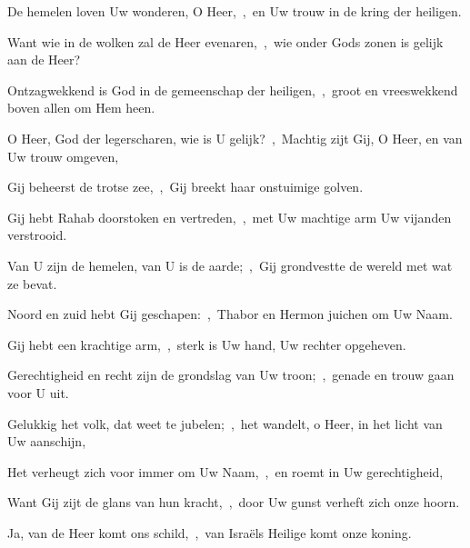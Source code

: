 \documentclass[12pt,twoside,a5paper]{article}
\begin{document}
\begin{halfparskip}
  De hemelen loven Uw wonderen, O Heer,~\sep\ en Uw trouw in de kring der heiligen.

  Want wie in de wolken zal de Heer evenaren,~\sep\ wie onder Gods zonen is gelijk aan de Heer?

  Ontzagwekkend is God in de gemeenschap der heiligen,~\sep\ groot en vreeswekkend boven allen om Hem heen.

  O Heer, God der legerscharen, wie is U gelijk?~\sep\ Machtig zijt Gij, O Heer, en van Uw trouw omgeven,

  Gij beheerst de trotse zee,~\sep\ Gij breekt haar onstuimige golven.

  Gij hebt Rahab doorstoken en vertreden,~\sep\ met Uw machtige arm Uw vijanden verstrooid.

  Van U zijn de hemelen, van U is de aarde;~\sep\ Gij grondvestte de wereld met wat ze bevat.

  Noord en zuid hebt Gij geschapen:~\sep\ Thabor en Hermon juichen om Uw Naam.

  Gij hebt een krachtige arm,~\sep\ sterk is Uw hand, Uw rechter opgeheven.

  Gerechtigheid en recht zijn de grondslag van Uw troon;~\sep\ genade en trouw gaan voor U uit.

  Gelukkig het volk, dat weet te jubelen;~\sep\ het wandelt, o Heer, in het licht van Uw aanschijn,

  Het verheugt zich voor immer om Uw Naam,~\sep\ en roemt in Uw gerechtigheid,

  Want Gij zijt de glans van hun kracht,~\sep\ door Uw gunst verheft zich onze hoorn.

  Ja, van de Heer komt ons schild,~\sep\ van Israëls Heilige komt onze koning.
\end{halfparskip}

\end{document}

